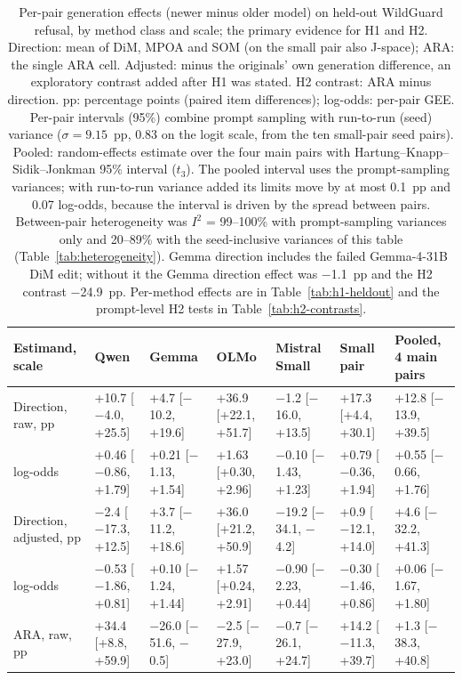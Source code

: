 \begin{table}[t]
\centering\scriptsize
\setlength{\tabcolsep}{2pt}
\caption{Per-pair generation effects (newer minus older model) on held-out WildGuard refusal, by method class and
scale; the primary evidence for H1 and H2. Direction: mean of DiM, MPOA and SOM (on the small pair also J-space); ARA:
the single ARA cell. Adjusted: minus the originals' own generation difference, an exploratory contrast added after H1
was stated. H2 contrast: ARA minus direction. pp: percentage points (paired item differences); log-odds: per-pair GEE.
Per-pair intervals (95\%) combine prompt sampling with run-to-run (seed) variance ($\sigma=9.15$~pp, 0.83 on the logit
scale, from the ten small-pair seed pairs). Pooled: random-effects estimate over the four main pairs with
Hartung--Knapp--Sidik--Jonkman 95\% interval ($t_3$). The pooled interval uses the prompt-sampling variances; with
run-to-run variance added its limits move by at most 0.1~pp and 0.07 log-odds, because the interval is driven by the
spread between pairs. Between-pair heterogeneity was $I^2$ = 99--100\% with prompt-sampling variances only and 20--89\%
with the seed-inclusive variances of this table (Table~\ref{tab:heterogeneity}). Gemma direction includes the failed
Gemma-4-31B DiM edit; without it the Gemma direction effect was $-$1.1~pp and the H2 contrast $-$24.9~pp. Per-method
effects are in Table~\ref{tab:h1-heldout} and the prompt-level H2 tests in Table~\ref{tab:h2-contrasts}.}
\label{tab:pair-effects}
\begin{tabular}{@{}lllllll@{}}
\toprule
Estimand, scale & Qwen & Gemma & OLMo & Mistral Small & Small pair & Pooled, 4 main pairs \\
\midrule
Direction, raw, pp & +10.7 [$-$4.0, +25.5] & +4.7 [$-$10.2, +19.6] & +36.9 [+22.1, +51.7] & $-$1.2 [$-$16.0, +13.5] & +17.3 [+4.4, +30.1] & +12.8 [$-$13.9, +39.5] \\
\quad log-odds & +0.46 [$-$0.86, +1.79] & +0.21 [$-$1.13, +1.54] & +1.63 [+0.30, +2.96] & $-$0.10 [$-$1.43, +1.23] & +0.79 [$-$0.36, +1.94] & +0.55 [$-$0.66, +1.76] \\
Direction, adjusted, pp & $-$2.4 [$-$17.3, +12.5] & +3.7 [$-$11.2, +18.6] & +36.0 [+21.2, +50.9] & $-$19.2 [$-$34.1, $-$4.2] & +0.9 [$-$12.1, +14.0] & +4.6 [$-$32.2, +41.3] \\
\quad log-odds & $-$0.53 [$-$1.86, +0.81] & +0.10 [$-$1.24, +1.44] & +1.57 [+0.24, +2.91] & $-$0.90 [$-$2.23, +0.44] & $-$0.30 [$-$1.46, +0.86] & +0.06 [$-$1.67, +1.80] \\
\midrule
ARA, raw, pp & +34.4 [+8.8, +59.9] & $-$26.0 [$-$51.6, $-$0.5] & $-$2.5 [$-$27.9, +23.0] & $-$0.7 [$-$26.1, +24.7] & +14.2 [$-$11.3, +39.7] & +1.3 [$-$38.3, +40.8] \\

\end{tabular}
\end{table}
